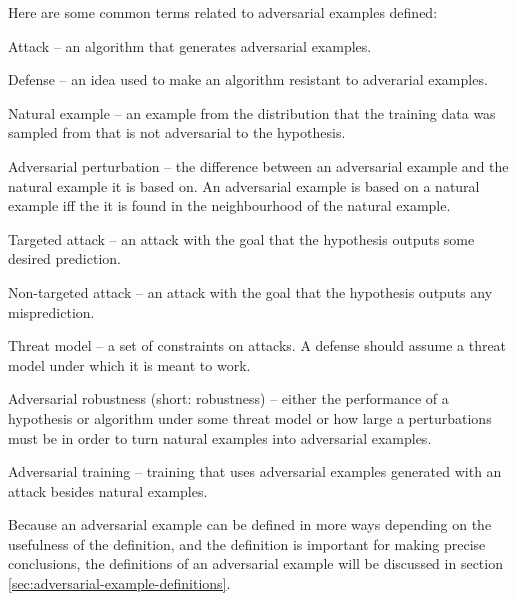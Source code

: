\documentclass[twocolumn]{article}
\begin{document}
Here are some common terms related to adversarial examples defined:
\begin{soliditemize}
	\item Attack -- an algorithm that generates adversarial examples.
	\item Defense -- an idea used to make an algorithm resistant to adverarial examples.
	\item Natural example -- an example from the distribution that the training data was sampled from that is not adversarial to the hypothesis.
	\item Adversarial perturbation -- the difference between an adversarial example and the natural example it is based on. An adversarial example is based on a natural example iff the it is found in the neighbourhood of the natural example.
	\item Targeted attack -- an attack with the goal that the hypothesis outputs some desired prediction.
	\item Non-targeted attack -- an attack with the goal that the hypothesis outputs any misprediction.
	\item Threat model -- a set of constraints on attacks. A defense should assume a threat model under which it is meant to work.
	\item Adversarial robustness (short: robustness) -- either the performance of a hypothesis or algorithm under some threat model or how large a perturbations must be in order to turn natural examples into adversarial examples.
	\item Adversarial training -- training that uses adversarial examples generated with an attack besides natural examples.
\end{soliditemize}
Because an adversarial example can be defined in more ways depending on the usefulness of the definition, and the definition is important for making precise conclusions, the definitions of an adversarial example will be discussed in section \ref{sec:adversarial-example-definitions}.
\end{document}
